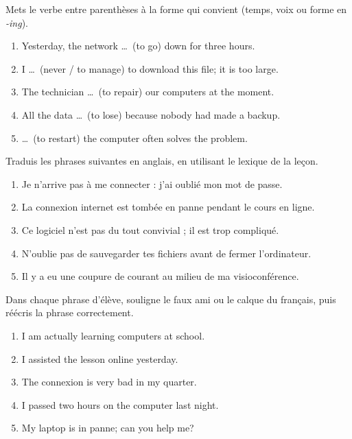 \documentclass[11pt]{article}
\newcounter{popsec}
\newcounter{popsub}
\newcommand{\courssub}[1]{%
  \stepcounter{popsub}%
  \par\vspace{9pt}\noindent{\popxbold\fontsize{11.5}{13}\selectfont\color{popink}{\color{poporange}\thepopsec.\thepopsub}\hspace{6pt}#1}\par\nopagebreak\vspace{4pt}
}
\begin{document}
\begin{exercice}
Mets le verbe entre parenthèses à la forme qui convient (temps, voix ou forme en \emph{-ing}).
\begin{enumerate}
\item Yesterday, the network \ldots\ (to go) down for three hours.
\item I \ldots\ (never / to manage) to download this file; it is too large.
\item The technician \ldots\ (to repair) our computers at the moment.
\item All the data \ldots\ (to lose) because nobody had made a backup.
\item \ldots\ (to restart) the computer often solves the problem.
\end{enumerate}
\end{exercice}

\courssub{Je m'entraîne}

\begin{exercice}[Traduction]
Traduis les phrases suivantes en anglais, en utilisant le lexique de la leçon.
\begin{enumerate}
\item Je n'arrive pas à me connecter : j'ai oublié mon mot de passe.
\item La connexion internet est tombée en panne pendant le cours en ligne.
\item Ce logiciel n'est pas du tout convivial ; il est trop compliqué.
\item N'oublie pas de sauvegarder tes fichiers avant de fermer l'ordinateur.
\item Il y a eu une coupure de courant au milieu de ma visioconférence.
\end{enumerate}
\end{exercice}

\begin{exercice}
Dans chaque phrase d'élève, souligne le faux ami ou le calque du français, puis réécris la phrase correctement.
\begin{enumerate}
\item I am actually learning computers at school.
\item I assisted the lesson online yesterday.
\item The connexion is very bad in my quarter.
\item I passed two hours on the computer last night.
\item My laptop is in panne; can you help me?
\end{enumerate}
\end{exercice}
\end{document}
